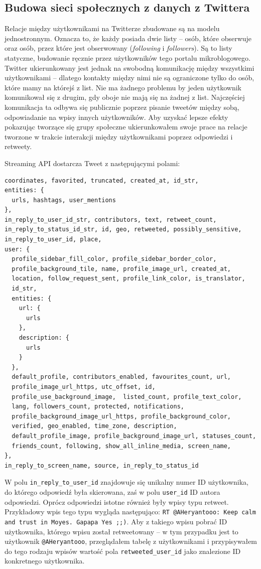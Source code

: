 \subsection{Budowa sieci społecznych z danych z Twittera}
Relacje między użytkownikami na Twitterze zbudowane są na modelu jednostronnym.
Oznacza to, że każdy posiada dwie listy -- osób, które obserwuje oraz osób,
przez które jest obserwowany (\textit{following} i \textit{followers}).
Są to listy statyczne, budowanie ręcznie przez użytkowników tego portalu
mikroblogowego. Twitter ukierunkowany jest jednak na swobodną komunikację między
wszystkimi użytkownikami -- dlatego kontakty między nimi nie są ograniczone
tylko do osób, które mamy na którejś z list. Nie ma żadnego problemu by jeden
użytkownik komunikował się z drugim, gdy oboje nie mają się na żadnej z list.
Najczęściej komunikacja ta odbywa się publicznie poprzez pisanie tweetów między
sobą, odpowiadanie na wpisy innych użytkowników. Aby uzyskać lepsze efekty
pokazując tworzące się grupy społeczne ukierunkowałem swoje prace na relacje
tworzone w trakcie interakcji między użytkownikami poprzez odpowiedzi i
retweety.

Streaming API dostarcza Tweet z następującymi polami: 
\begin{verbatim}
coordinates, favorited, truncated, created_at, id_str,
entities: {
  urls, hashtags, user_mentions
},
in_reply_to_user_id_str, contributors, text, retweet_count, 
in_reply_to_status_id_str, id, geo, retweeted, possibly_sensitive, 
in_reply_to_user_id, place,
user: {
  profile_sidebar_fill_color, profile_sidebar_border_color, 
  profile_background_tile, name, profile_image_url, created_at, 
  location, follow_request_sent, profile_link_color, is_translator,
  id_str, 
  entities: {
    url: {
      urls
    },
    description: {
      urls
    }
  },
  default_profile, contributors_enabled, favourites_count, url, 
  profile_image_url_https, utc_offset, id, 
  profile_use_background_image,  listed_count, profile_text_color, 
  lang, followers_count, protected, notifications, 
  profile_background_image_url_https, profile_background_color,
  verified, geo_enabled, time_zone, description,
  default_profile_image, profile_background_image_url, statuses_count,
  friends_count, following, show_all_inline_media, screen_name, 
},
in_reply_to_screen_name, source, in_reply_to_status_id
\end{verbatim} 

W polu \texttt{in\_reply\_to\_user\_id} znajdowuje się unikalny numer ID
użytkownika, do którego odpowiedź była skierowana, zaś w polu \texttt{user\_id}
ID autora odpowiedzi. 
Oprócz odpowiedzi istotne również były wpisy typu retweet. Przykładowy wpis tego
typu wygląda następująco: \texttt{RT @AHeryantooo: Keep calm and trust in Moyes. Gapapa Yes ;;)}.
Aby z takiego wpisu pobrać ID użytkownika, którego wpisu został retweetowany -- w tym
przypadku jest to użytkownik \texttt{@AHeryantooo}, przeglądałem tabelę z użytkownikami
i przypisywałem do tego rodzaju wpisów wartość pola \texttt{retweeted\_user\_id}
jako znalezione ID konkretnego użytkownika.

